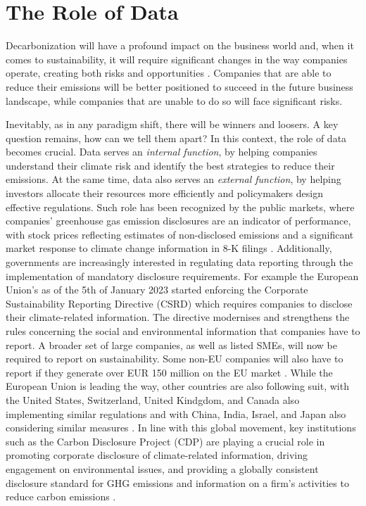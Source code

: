 \section{The Role of Data}
Decarbonization will have a profound impact on the business world and, when it comes to sustainability, it will require significant changes in the way companies operate, creating both risks and opportunities \cite{purpose+profit}. Companies that are able to reduce their emissions will be better positioned to succeed in the future business landscape, while companies that are unable to do so will face significant risks. 

Inevitably, as in any paradigm shift, there will be winners and loosers. A key question remains, how can we tell them apart? In this context, the role of data becomes crucial. Data serves an \textit{internal function}, by helping companies understand their climate risk and identify the best strategies to reduce their emissions. At the same time, data also serves an \textit{external function}, by helping investors allocate their resources more efficiently and policymakers design effective regulations. Such role has been recognized by the public markets, where companies' greenhouse gas emission disclosures are an indicator of performance, with stock prices reflecting estimates of non-disclosed emissions and a significant market response to climate change information in 8-K filings \cite{Griffin}. Additionally, governments are increasingly interested in regulating data reporting through the implementation of mandatory disclosure requirements. For example the European Union's as of the 5th of January 2023 started enforcing the Corporate Sustainability Reporting Directive (CSRD) which requires companies to disclose their climate-related information. The directive modernises and strengthens the rules concerning the social and environmental information that companies have to report. A broader set of large companies, as well as listed SMEs, will now be required to report on sustainability. Some non-EU companies will also have to report if they generate over EUR 150 million on the EU market \cite{EuropeanCommission2023}. While the European Union is leading the way, other countries are also following suit, with the United States, Switzerland, United Kindgdom, and Canada also implementing similar regulations and with China, India, Israel, and Japan also considering similar measures \cite{Jonson2022}. In line with this global movement, key institutions such as the Carbon Disclosure Project (CDP) are  playing a crucial role in promoting corporate disclosure of climate-related information, driving engagement on environmental issues, and providing a globally consistent disclosure standard for GHG emissions and information on a firm’s activities to reduce carbon emissions \cite{CDP2024}. 





